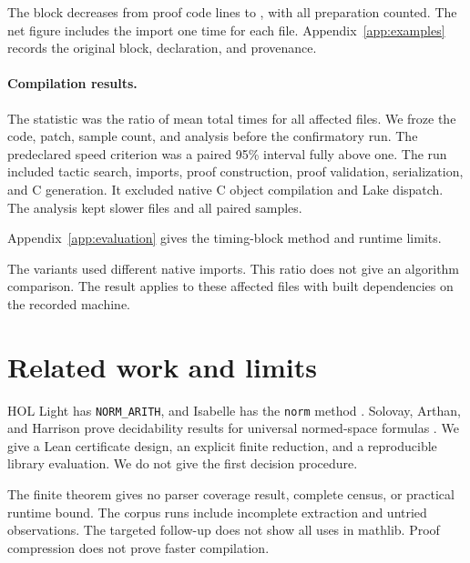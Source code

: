 \documentclass{article}
\begin{document}

The block decreases from \CaseBefore{} proof code lines to \CaseAfter{}, with all preparation counted.
The net figure includes the import one time for each file.
Appendix~\ref{app:examples} records the original block, declaration, and provenance.

\paragraph{Compilation results.}
The statistic was the ratio of mean total times for all affected files.
We froze the code, patch, sample count, and analysis before the confirmatory run.
The predeclared speed criterion was a paired 95\% interval fully above one.
The run included tactic search, imports, proof construction, proof validation, serialization, and C generation.
It excluded native C object compilation and Lake dispatch.
The analysis kept slower files and all paired samples.

Appendix~\ref{app:evaluation} gives the timing-block method and runtime limits.



The variants used different native imports.
This ratio does not give an algorithm comparison.
The result applies to these affected files with built dependencies on the recorded machine.

\section{Related work and limits}
HOL Light has \texttt{NORM\_ARITH}, and Isabelle has the \texttt{norm} method \citep{hollightnorm,isabellenorm}.
Solovay, Arthan, and Harrison prove decidability results for universal normed-space formulas \citep{solovay2012}.
We give a Lean certificate design, an explicit finite reduction, and a reproducible library evaluation.
We do not give the first decision procedure.

The finite theorem gives no parser coverage result, complete census, or practical runtime bound.
The corpus runs include incomplete extraction and untried observations.
The targeted follow-up does not show all uses in mathlib.
Proof compression does not prove faster compilation.
\label{main-end}

\clearpage


\clearpage
\appendix

\begingroup
{}

\endgroup
\end{document}
